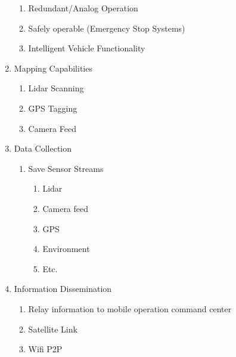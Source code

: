 \begin{enumerate}
\begin{enumerate}
            \item Redundant/Analog Operation
            \item Safely operable (Emergency Stop Systems)
            \item Intelligent Vehicle Functionality
        \end{enumerate}
        \item Mapping Capabilities
        \begin{enumerate}
        	\item Lidar Scanning
            \item GPS Tagging
            \item Camera Feed
        \end{enumerate}
        \item Data Collection
        \begin{enumerate}
        	\item Save Sensor Streams
            \begin{enumerate}
        		\item Lidar
            	\item Camera feed
            	\item GPS
            	\item Environment
           		\item Etc.
       		\end{enumerate}
        \end{enumerate}
        \item Information Dissemination
        \begin{enumerate}
        	\item Relay information to mobile operation command center
            \item Satellite Link
            \item Wifi P2P
        \end{enumerate}
	\end{enumerate}
